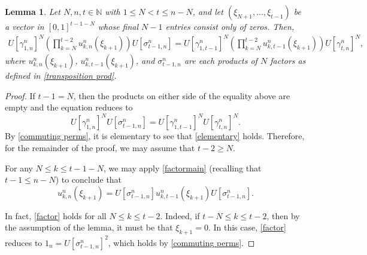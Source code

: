 \documentclass[12pt]{amsart}
\numberwithin{equation}{section}
\newtheorem{lemma}[theorem]{Lemma}
\theoremstyle{definition}
\theoremstyle{remark}
\newcommand{\NN}{\mathbb{N}}
\begin{document}
\begin{lemma}
	\label{calculation}
	Let $N,n,t\in\NN$ with $1\leq N<t\leq n-N$, and let $(\xi_{N+1},\ldots,\xi_{t-1})$ be a vector in $[0,1]^{t-1-N}$ whose final $N-1$ entries consist only of zeros. Then,	
	$$
	\begin{aligned}
		U[\gamma^{n}_{1,n}]^{N}\left(\prod_{k=N}^{t-2}u^{n}_{k,n}(\xi_{k+1})\right)U[\sigma^{n}_{t-1,n}]
		=U[\gamma^{n}_{1,t-1}]^{N}\left(\prod_{k=N}^{t-2}u^{n}_{k,t-1}(\xi_{k+1})\right)U[\gamma^{n}_{t,n}]^{N},
	\end{aligned}
	$$
	where $u_{k,n}^{n}(\xi_{k+1})$, $u_{k,t-1}^{n}(\xi_{k+1})$, and $\sigma_{t-1,n}^{n}$ are each products of $N$ factors as defined in \autoref{transposition prod}.
\end{lemma}	
\begin{proof}
	If $t-1=N$, then the products on either side of the equality above are empty and the equation reduces to
	\begin{equation}
		\label{elementary}
		U[\gamma^{n}_{1,n}]^{N}U[\sigma^{n}_{t-1,n}]=U[\gamma^{n}_{1,t-1}]^{N}U[\gamma^{n}_{t,n}]^{N}.
	\end{equation}
	By \autoref{commuting perms}, it is elementary to see that \autoref{elementary} holds. Therefore, for the remainder of the proof, we may assume that $t-2\geq N$. 
	
	For any $N\leq k\leq t-1-N$, we may apply \autoref{factormain} (recalling that $t-1\leq n-N$) to conclude that
	\begin{equation}
		\label{factor}
		u^{n}_{k,n}(\xi_{k+1})=U[\sigma^{n}_{t-1,n}]u^{n}_{k,t-1}(\xi_{k+1})U[\sigma^{n}_{t-1,n}].
	\end{equation}
	
	In fact, \autoref{factor} holds for all $N\leq k\leq t-2$. Indeed, if $t-N\leq k\leq t-2$, then by the assumption of the lemma, it must be that $\xi_{k+1}=0$. In this case, \autoref{factor} reduces to $1_{n}=U[\sigma^{n}_{t-1,n}]^{2}$, which holds by \autoref{commuting perms}. 
	

\end{proof}
\end{document}
